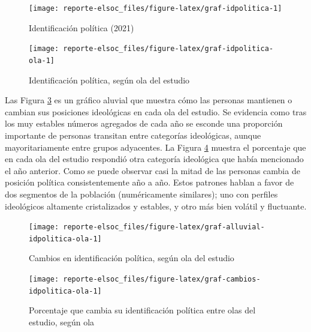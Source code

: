 \documentclass[
  12pt,
]{book}
\begin{document}
\begin{figure}

{\centering \texttt{[image: reporte-elsoc\_files/figure-latex/graf-idpolitica-1]} 

}

\caption{Identificación política (2021)}\label{fig:graf-idpolitica}
\end{figure}

\begin{figure}

{\centering \texttt{[image: reporte-elsoc\_files/figure-latex/graf-idpolitica-ola-1]} 

}

\caption{Identificación política, según ola del estudio}\label{fig:graf-idpolitica-ola}
\end{figure}

Las Figura \ref{fig:graf-alluvial-idpolitica-ola} es un gráfico aluvial que muestra cómo las personas mantienen o cambian sus posiciones ideológicas en cada ola del estudio. Se evidencia como tras los muy estables números agregados de cada año se esconde una proporción importante de personas transitan entre categorías ideológicas, aunque mayoritariamente entre grupos adyacentes. La Figura \ref{fig:graf-cambios-idpolitica-ola} muestra el porcentaje que en cada ola del estudio respondió otra categoría ideológica que había mencionado el año anterior. Como se puede observar casi la mitad de las personas cambia de posición política consistentemente año a año. Estos patrones hablan a favor de dos segmentos de la población (numéricamente similares); uno con perfiles ideológicos altamente cristalizados y estables, y otro más bien volátil y fluctuante.

\begin{figure}

{\centering \texttt{[image: reporte-elsoc\_files/figure-latex/graf-alluvial-idpolitica-ola-1]} 

}

\caption{Cambios en identificación política, según ola del estudio}\label{fig:graf-alluvial-idpolitica-ola}
\end{figure}

\begin{figure}

{\centering \texttt{[image: reporte-elsoc\_files/figure-latex/graf-cambios-idpolitica-ola-1]} 

}

\caption{Porcentaje que cambia su identificación política entre olas del estudio, según ola}\label{fig:graf-cambios-idpolitica-ola}
\end{figure}
\end{document}
